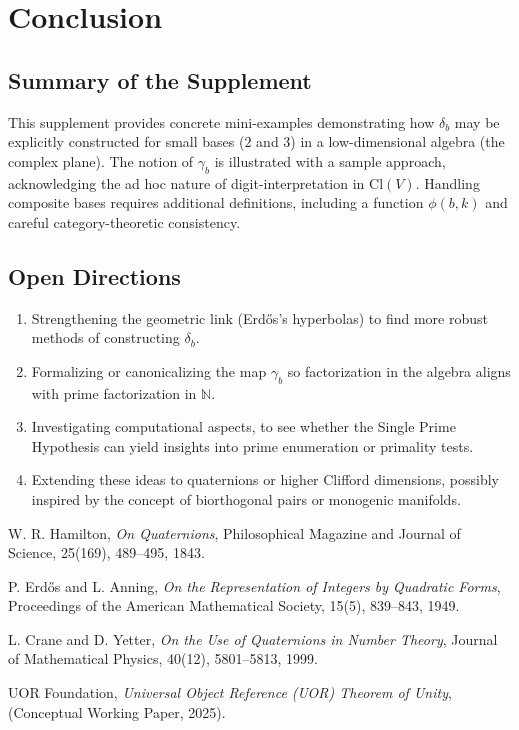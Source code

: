 \documentclass[11pt]{article}
\begin{document}
\section{Conclusion}

\subsection{Summary of the Supplement}
This supplement provides concrete mini-examples demonstrating how $\delta_b$ 
may be explicitly constructed for small bases ($2$ and $3$) in a low-dimensional 
algebra (the complex plane). The notion of $\gamma_b$ is illustrated with 
a sample approach, acknowledging the ad hoc nature of digit-interpretation 
in $\mathrm{Cl}(V)$. Handling composite bases requires additional definitions, 
including a function $\phi(b,k)$ and careful category-theoretic consistency. 

\subsection{Open Directions}
\begin{enumerate}
\item Strengthening the geometric link (Erd\H{o}s’s hyperbolas) to find 
  more robust methods of constructing $\delta_b$.
\item Formalizing or canonicalizing the map $\gamma_b$ so factorization 
  in the algebra aligns with prime factorization in $\mathbb{N}$.
\item Investigating computational aspects, to see whether the Single Prime 
  Hypothesis can yield insights into prime enumeration or primality tests.
\item Extending these ideas to quaternions or higher Clifford dimensions, 
  possibly inspired by the concept of biorthogonal pairs or monogenic manifolds.
\end{enumerate}

\begin{thebibliography}{9}

W. R. Hamilton,
\emph{On Quaternions},
Philosophical Magazine and Journal of Science, 25(169), 489--495, 1843.

P. Erd\H{o}s and L. Anning,
\emph{On the Representation of Integers by Quadratic Forms},
Proceedings of the American Mathematical Society, 15(5), 839--843, 1949.

L. Crane and D. Yetter,
\emph{On the Use of Quaternions in Number Theory},
Journal of Mathematical Physics, 40(12), 5801--5813, 1999.

UOR Foundation,
\emph{Universal Object Reference (UOR) Theorem of Unity}, 
(Conceptual Working Paper, 2025).

\end{thebibliography}
\end{document}
